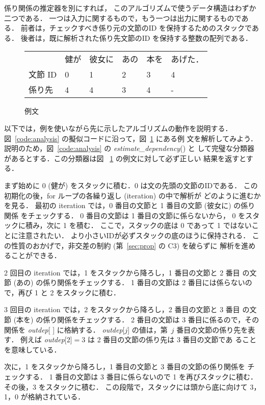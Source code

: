 \documentclass[japanese]{jnlp_1.2c}
\begin{document}
係り関係の推定器を別にすれば，
このアルゴリズムで使うデータ構造はわずか二つである．
一つは入力に関するもので，もう一つは出力に関するものである．
前者は，チェックすべき係り元の文節のID を保持するためのスタックである．
後者は，既に解析された係り先文節のID を保持する整数の配列である．


\begin{figure}[t]
\begin{center}
\begin{tabular}{llllll}
       & 健が & 彼女に & あの & 本を & あげた． \\
文節 ID     & 0    &  1     & 2    & 3    & 4 \\
係り先 & 4  &4  & 3    & 4    & -
\end{tabular}
\end{center}
\vspace{8pt}
\caption{例文}
\label{sample-parsing}
\end{figure}

以下では，例を使いながら先に示したアルゴリズムの動作を説明する．
図~\ref{code:analysis} の擬似コードに沿って，図~\ref{sample-parsing} にある例
文を解析してみよう．
説明のため，図~\ref{code:analysis} の {\it estimate\_dependency}() と
して完璧な分類器があるとする．この分類器は図
~\ref{sample-parsing} の例文に対して必ず正しい
結果を返すとする．

まず始めに 0 (健が) をスタックに積む．0 は文の先頭の文節のIDである．
この初期化の後，{\rm for} ループの各繰り返し (iteration) の中で解析が
どのように進むかを見る．
最初の iteration では，0 番目の文節と 1 番目の文節 (彼女に) の係り関係
をチェックする．
0 番目の文節は 1 番目の文節に係らないから，
0 をスタックに積み，次に 1 を積む．
ここで，スタックの底は 0 であって 1 ではないことに注意されたい．
より小さいIDが必ずスタックの底のほうに保持される．
この性質のおかげで，非交差の制約 (第~\ref{sec:prop} の C3) を破らずに
解析を進めることができる．

2 回目の iteration では，1 をスタックから降ろし，1 番目の文節と 2 番目
の文節 (あの) の係り関係をチェックする．
1 番目の文節は 2 番目には係らないので，再び 1 と 2 をスタックに積む．

3 回目の iteration では，2 をスタックから降ろし，2 番目の文節と 3 番目
の文節 (本を) の係り関係をチェックする．
2 番目の文節は 3 番目に係るので，その関係を {\it outdep}[ ] に格納する．
{\it outdep}[$j$] の値は，第~$j$ 番目の文節の係り先を表す．
例えば {\it outdep}[$2$]$ = 3$ は 2 番目の文節の係り先は 3 番目の文節であ
ることを意味している．

次に，1 をスタックから降ろし，1 番目の文節と 3 番目の文節の係り関係を
チェックする．
1 番目の文節は 3 番目に係らないので 1 を再びスタックに積む．
その後，3 をスタックに積む．
この段階で，スタックには頭から底に向けて 3，1，0 が格納されている．
\end{document}
